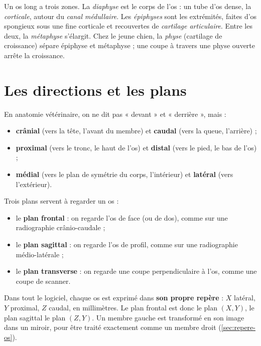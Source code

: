 Un os long a trois zones. La \emph{diaphyse} est le corps de l'os : un tube d'os dense, la \emph{corticale}, autour du
\emph{canal médullaire}. Les \emph{épiphyses} sont les extrémités, faites d'os spongieux sous une fine corticale et
recouvertes de \emph{cartilage articulaire}. Entre les deux, la \emph{métaphyse} s'élargit. Chez le jeune chien, la
\emph{physe} (cartilage de croissance) sépare épiphyse et métaphyse ; une coupe à travers une physe ouverte arrête la
croissance.

\section{Les directions et les plans}
\label{sec:directions}

En anatomie vétérinaire, on ne dit pas « devant » et « derrière », mais :
\begin{itemize}
  \item \textbf{crânial} (vers la tête, l'avant du membre) et \textbf{caudal} (vers la queue, l'arrière) ;
  \item \textbf{proximal} (vers le tronc, le haut de l'os) et \textbf{distal} (vers le pied, le bas de l'os) ;
  \item \textbf{médial} (vers le plan de symétrie du corps, l'intérieur) et \textbf{latéral} (vers l'extérieur).
\end{itemize}

Trois plans servent à regarder un os :
\begin{itemize}
  \item le \textbf{plan frontal} : on regarde l'os de face (ou de dos), comme sur une radiographie
  crânio-caudale ;
  \item le \textbf{plan sagittal} : on regarde l'os de profil, comme sur une radiographie médio-latérale ;
  \item le \textbf{plan transverse} : on regarde une coupe perpendiculaire à l'os, comme une coupe de scanner.
\end{itemize}

\begin{aretenir}
Dans tout le logiciel, chaque os est exprimé dans \textbf{son propre repère} : $X$ latéral, $Y$ proximal, $Z$ caudal,
en millimètres. Le plan frontal est donc le plan $(X, Y)$, le plan sagittal le plan $(Z, Y)$. Un membre gauche est
transformé en son image dans un miroir, pour être traité exactement comme un membre droit
(\cref{sec:repere-os}).
\end{aretenir}

